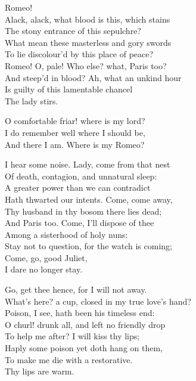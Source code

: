 \begin{speech}
Romeo!  \\
Alack, alack, what blood is this, which stains \\
The stony entrance of this sepulchre? \\
What mean these masterless and gory swords \\
To lie discolour'd by this place of peace? 
\\
Romeo! O, pale!   Who else? what, Paris too? \\
And steep'd in blood?   Ah, what an unkind hour \\
Is guilty of this lamentable chancel \\
The lady stirs.  \\
\end{speech}
\begin{speech}
O comfortable friar! where is my lord? \\
I do remember well where I should be, \\
And there I am. Where is my Romeo?  \\

\end{speech}
\begin{speech}
I hear some noise.   Lady, come from that nest
\\
Of death, contagion, and unnatural sleep: \\
A greater power than we can contradict \\
Hath thwarted our intents. Come, come away, \\
Thy husband in thy bosom there lies dead; \\
And Paris too. Come, I'll dispose of thee \\
Among a sisterhood of holy nuns: \\
Stay not to question, for the watch is coming; \\
Come, go, good Juliet,  \\
I dare no longer stay. \\
\end{speech}
\begin{speech}
Go, get thee hence, for I will not away.  \\
What's here? a cup, closed in my true love's hand? \\
Poison, I see, hath been his timeless end: \\
O churl! drunk all, and left no friendly drop \\
To help me after?   I will kiss thy lips; \\
Haply some poison yet doth hang on them, \\
To make me die with a restorative.  \\
Thy lips are warm. \\
\end{speech}

